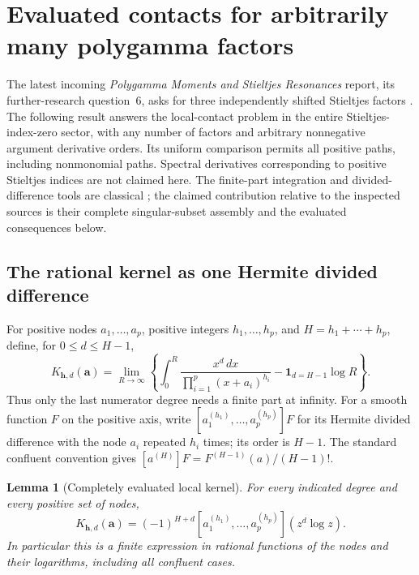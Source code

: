 \documentclass[11pt,a4paper]{article}
\newtheorem{lemma}[theorem]{Lemma}
\theoremstyle{definition}
\theoremstyle{remark}
\numberwithin{equation}{section}
\begin{document}
\section{Evaluated contacts for arbitrarily many polygamma factors}
\label{pc:section}

The latest incoming \emph{Polygamma Moments and Stieltjes Resonances}
report, its further-research question~6, asks for three independently shifted
Stieltjes factors \cite{PolygammaResonances}.  The following result answers the local-contact problem in the entire
Stieltjes-index-zero sector, with any number of factors and arbitrary
nonnegative argument derivative orders.  Its uniform comparison permits
all positive paths, including nonmonomial paths.  Spectral derivatives
corresponding to positive Stieltjes indices are not claimed here.
The finite-part integration and divided-difference tools are classical
\cite{DeBoor,TicaGalapon,VillanuevaGalapon};
the claimed contribution relative to the inspected sources is their
complete singular-subset assembly and the evaluated consequences below.

\subsection{The rational kernel as one Hermite divided difference}

For positive nodes $a_1,\ldots,a_p$, positive integers
$h_1,\ldots,h_p$, and $H=h_1+\cdots+h_p$, define, for
$0\le d\le H-1$,
\begin{equation}\label{pc:kernel-def}
 K_{\boldsymbol h,d}(\boldsymbol a)
 =\lim_{R\to\infty}\left\{
       \int_0^R\frac{x^d\,dx}{\prod_{i=1}^p(x+a_i)^{h_i}}
                 -\mathbf1_{d=H-1}\log R\right\}.
\end{equation}
Thus only the last numerator degree needs a finite part at infinity.
For a smooth function $F$ on the positive axis, write
$[a_1^{(h_1)},\ldots,a_p^{(h_p)}]F$ for its Hermite divided
difference with the node $a_i$ repeated $h_i$ times; its order is $H-1$.
The standard confluent convention \cite{DeBoor} gives
$[a^{(H)}]F=F^{(H-1)}(a)/(H-1)!$.

\begin{lemma}[Completely evaluated local kernel]\label{pc:kernel}
For every indicated degree and every positive set of nodes,
\begin{equation}\label{pc:kernel-dd}
 \boxed{\displaystyle
 K_{\boldsymbol h,d}(\boldsymbol a)
     =(-1)^{H+d}
       [a_1^{(h_1)},\ldots,a_p^{(h_p)}](z^d\log z).}
\end{equation}
In particular this is a finite expression in rational functions of the
nodes and their logarithms, including all confluent cases.
\end{lemma}
\end{document}

